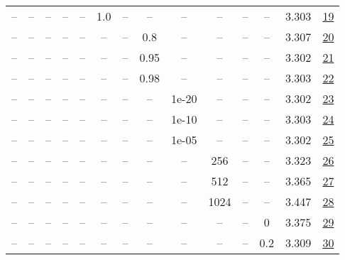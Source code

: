 \begin{table}[H]
\begin{tabular}{cccccccccccccc}
-- & -- & -- & -- & -- & 1.0 & -- & -- & -- & -- & -- & -- & 3.303 & \href{https://wandb.ai/stanford-mercury/optimizer-scaling/runs/sweep-130m-10B-scion9a40b3lr0.008-wd0.1-minlr0-warmup0-b10.98-gn-ddc1ee}{19} \\
-- & -- & -- & -- & -- & -- & -- & 0.8 & -- & -- & -- & -- & 3.307 & \href{https://wandb.ai/stanford-mercury/optimizer-scaling/runs/sweep-130m-10B-scionb9d13elr0.008-wd0.1-minlr0-warmup0-b10.98-gn-60ca44}{20} \\
-- & -- & -- & -- & -- & -- & -- & 0.95 & -- & -- & -- & -- & 3.302 & \href{https://wandb.ai/stanford-mercury/optimizer-scaling/runs/sweep-130m-10B-scion79d871lr0.008-wd0.1-minlr0-warmup0-b10.98-gn-d7d690}{21} \\
-- & -- & -- & -- & -- & -- & -- & 0.98 & -- & -- & -- & -- & 3.303 & \href{https://wandb.ai/stanford-mercury/optimizer-scaling/runs/sweep-130m-10B-scion7c7f25lr0.008-wd0.1-minlr0-warmup0-b10.98-gn-78ad4e}{22} \\
-- & -- & -- & -- & -- & -- & -- & -- & 1e-20 & -- & -- & -- & 3.302 & \href{https://wandb.ai/stanford-mercury/optimizer-scaling/runs/sweep-130m-10B-scion31bca7lr0.008-wd0.1-minlr0-warmup0-b10.98-gn-c73231}{23} \\
-- & -- & -- & -- & -- & -- & -- & -- & 1e-10 & -- & -- & -- & 3.303 & \href{https://wandb.ai/stanford-mercury/optimizer-scaling/runs/sweep-130m-10B-scion95d589lr0.008-wd0.1-minlr0-warmup0-b10.98-gn-16884a}{24} \\
-- & -- & -- & -- & -- & -- & -- & -- & 1e-05 & -- & -- & -- & 3.302 & \href{https://wandb.ai/stanford-mercury/optimizer-scaling/runs/sweep-130m-10B-scion8d67e8lr0.008-wd0.1-minlr0-warmup0-b10.98-gn-f7a59e}{25} \\
-- & -- & -- & -- & -- & -- & -- & -- & -- & 256 & -- & -- & 3.323 & \href{https://wandb.ai/stanford-mercury/optimizer-scaling/runs/sweep-130m-10B-scion7ca424lr0.008-wd0.1-minlr0-warmup0-b10.98-gn-d5e3b1}{26} \\
-- & -- & -- & -- & -- & -- & -- & -- & -- & 512 & -- & -- & 3.365 & \href{https://wandb.ai/stanford-mercury/optimizer-scaling/runs/sweep-130m-10B-scion2cfaa6lr0.008-wd0.1-minlr0-warmup0-b10.98-gn-e446fe}{27} \\
-- & -- & -- & -- & -- & -- & -- & -- & -- & 1024 & -- & -- & 3.447 & \href{https://wandb.ai/stanford-mercury/optimizer-scaling/runs/sweep-130m-10B-scionafb44flr0.008-wd0.1-minlr0-warmup0-b10.98-gn-6aaf5e}{28} \\
-- & -- & -- & -- & -- & -- & -- & -- & -- & -- & -- & 0 & 3.375 & \href{https://wandb.ai/stanford-mercury/optimizer-scaling/runs/sweep-130m-10B-scion0b9b71lr0.008-wd0-minlr0-warmup0-b10.98-gn2--f9d527}{29} \\
-- & -- & -- & -- & -- & -- & -- & -- & -- & -- & -- & 0.2 & 3.309 & \href{https://wandb.ai/stanford-mercury/optimizer-scaling/runs/sweep-130m-10B-sciona5af5alr0.008-wd0.2-minlr0-warmup0-b10.98-gn-d9175f}{30} \\
\bottomrule
\end{tabular}
\end{table}

